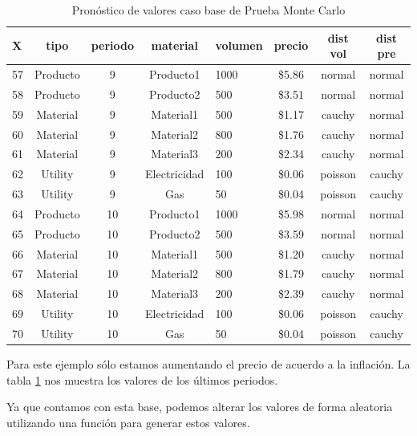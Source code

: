 \documentclass[
]{book}
\begin{document}
\begin{table}

\caption{\label{tab:montetest2}Pronóstico de valores caso base de Prueba Monte Carlo}
\centering
\begin{tabular}[t]{l|c|c|c|l|c|c|c}
\hline
X & tipo & periodo & material & volumen & precio & dist vol & dist pre\\
\hline
57 & Producto & 9 & Producto1 & 1000 & \$5.86 & normal & normal\\
\hline
58 & Producto & 9 & Producto2 & 500 & \$3.51 & normal & normal\\
\hline
59 & Material & 9 & Material1 & 500 & \$1.17 & cauchy & normal\\
\hline
60 & Material & 9 & Material2 & 800 & \$1.76 & cauchy & normal\\
\hline
61 & Material & 9 & Material3 & 200 & \$2.34 & cauchy & normal\\
\hline
62 & Utility & 9 & Electricidad & 100 & \$0.06 & poisson & cauchy\\
\hline
63 & Utility & 9 & Gas & 50 & \$0.04 & poisson & cauchy\\
\hline
64 & Producto & 10 & Producto1 & 1000 & \$5.98 & normal & normal\\
\hline
65 & Producto & 10 & Producto2 & 500 & \$3.59 & normal & normal\\
\hline
66 & Material & 10 & Material1 & 500 & \$1.20 & cauchy & normal\\
\hline
67 & Material & 10 & Material2 & 800 & \$1.79 & cauchy & normal\\
\hline
68 & Material & 10 & Material3 & 200 & \$2.39 & cauchy & normal\\
\hline
69 & Utility & 10 & Electricidad & 100 & \$0.06 & poisson & cauchy\\
\hline
70 & Utility & 10 & Gas & 50 & \$0.04 & poisson & cauchy\\
\hline
\end{tabular}
\end{table}

Para este ejemplo sólo estamos aumentando el precio de acuerdo a la
inflación. La tabla \ref{tab:montetest2} nos muestra los valores de los
últimos periodos.

Ya que contamos con esta base, podemos alterar los valores de forma
aleatoria utilizando una función para generar estos valores.
\end{document}
